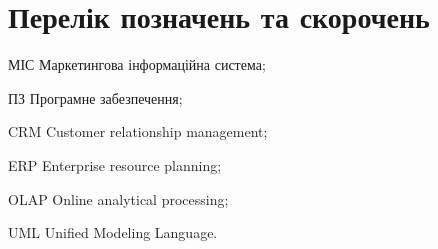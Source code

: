 \section*{Перелік позначень та скорочень}

\begin{abbrDescription}
\item[МІС] Маркетингова інформаційна система;
\item[ПЗ] Програмне забезпечення;
\item[CRM] Customer relationship management;
\item[ERP] Enterprise resource planning;
\item[OLAP] Online analytical processing;
\item[UML] Unified Modeling Language.
\end{abbrDescription}
